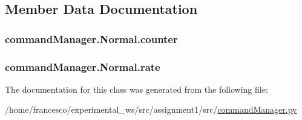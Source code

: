 \subsection{Member Data Documentation}
\subsubsection[{\texorpdfstring{counter}{counter}}]{\setlength{\rightskip}{0pt plus 5cm}command\+Manager.\+Normal.\+counter}\hypertarget{classcommandManager_1_1Normal_a5ebc9e1cc3847edb576acedd01487023}{}\label{classcommandManager_1_1Normal_a5ebc9e1cc3847edb576acedd01487023}
\subsubsection[{\texorpdfstring{rate}{rate}}]{\setlength{\rightskip}{0pt plus 5cm}command\+Manager.\+Normal.\+rate}\hypertarget{classcommandManager_1_1Normal_a32e84cf5ac08ffeb9cb1a21d4b484a32}{}\label{classcommandManager_1_1Normal_a32e84cf5ac08ffeb9cb1a21d4b484a32}


The documentation for this class was generated from the following file\+:\begin{DoxyCompactItemize}
\item 
/home/francesco/experimental\+\_\+ws/src/assignment1/src/\hyperlink{commandManager_8py}{command\+Manager.\+py}\end{DoxyCompactItemize}
